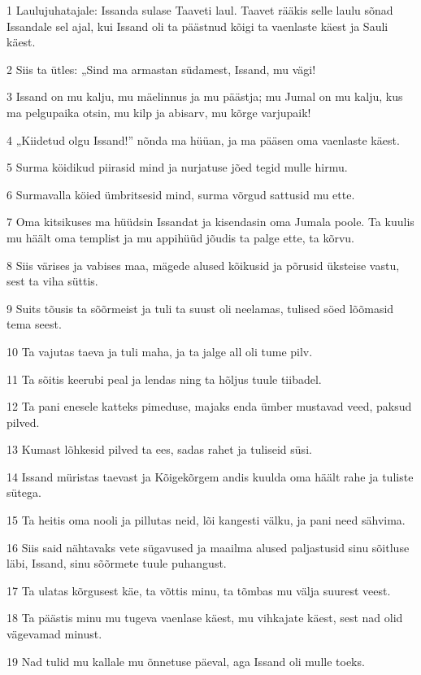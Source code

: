 \par 1 Laulujuhatajale: Issanda sulase Taaveti laul. Taavet rääkis selle laulu sõnad Issandale sel ajal, kui Issand oli ta päästnud kõigi ta vaenlaste käest ja Sauli käest.
\par 2 Siis ta ütles: „Sind ma armastan südamest, Issand, mu vägi!
\par 3 Issand on mu kalju, mu mäelinnus ja mu päästja; mu Jumal on mu kalju, kus ma pelgupaika otsin, mu kilp ja abisarv, mu kõrge varjupaik!
\par 4 „Kiidetud olgu Issand!” nõnda ma hüüan, ja ma pääsen oma vaenlaste käest.
\par 5 Surma köidikud piirasid mind ja nurjatuse jõed tegid mulle hirmu.
\par 6 Surmavalla köied ümbritsesid mind, surma võrgud sattusid mu ette.
\par 7 Oma kitsikuses ma hüüdsin Issandat ja kisendasin oma Jumala poole. Ta kuulis mu häält oma templist ja mu appihüüd jõudis ta palge ette, ta kõrvu.
\par 8 Siis värises ja vabises maa, mägede alused kõikusid ja põrusid üksteise vastu, sest ta viha süttis.
\par 9 Suits tõusis ta sõõrmeist ja tuli ta suust oli neelamas, tulised söed lõõmasid tema seest.
\par 10 Ta vajutas taeva ja tuli maha, ja ta jalge all oli tume pilv.
\par 11 Ta sõitis keerubi peal ja lendas ning ta hõljus tuule tiibadel.
\par 12 Ta pani enesele katteks pimeduse, majaks enda ümber mustavad veed, paksud pilved.
\par 13 Kumast lõhkesid pilved ta ees, sadas rahet ja tuliseid süsi.
\par 14 Issand müristas taevast ja Kõigekõrgem andis kuulda oma häält rahe ja tuliste sütega.
\par 15 Ta heitis oma nooli ja pillutas neid, lõi kangesti välku, ja pani need sähvima.
\par 16 Siis said nähtavaks vete sügavused ja maailma alused paljastusid sinu sõitluse läbi, Issand, sinu sõõrmete tuule puhangust.
\par 17 Ta ulatas kõrgusest käe, ta võttis minu, ta tõmbas mu välja suurest veest.
\par 18 Ta päästis minu mu tugeva vaenlase käest, mu vihkajate käest, sest nad olid vägevamad minust.
\par 19 Nad tulid mu kallale mu õnnetuse päeval, aga Issand oli mulle toeks.
